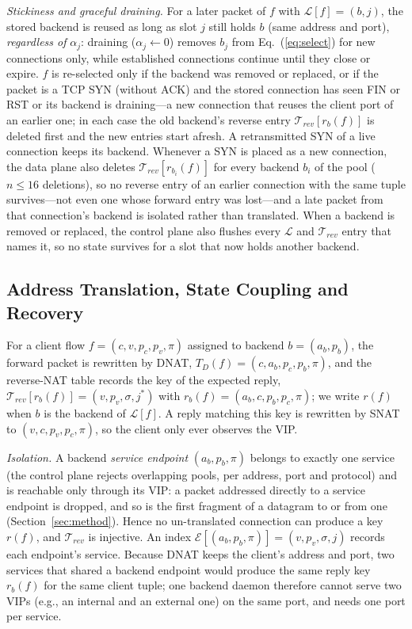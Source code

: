 \documentclass[conference]{IEEEtran}
\begin{document}
\textit{Stickiness and graceful draining.} For a later packet of $f$ with
$\mathcal{L}[f]=(b,j)$, the stored backend is reused as long as slot $j$ still
holds $b$ (same address and port), \emph{regardless of} $\alpha_j$: draining
($\alpha_j \gets 0$) removes $b_j$ from Eq.~(\ref{eq:select}) for new
connections only, while established connections continue until they close or
expire. $f$ is re-selected only if the backend was removed or replaced, or if
the packet is a TCP SYN (without ACK) and the stored connection has seen FIN or
RST or its backend is draining---a new connection that reuses the client port
of an earlier one; in each case the old backend's reverse entry
$\mathcal{T}_{rev}[r_{b}(f)]$ is deleted first and the new entries start
afresh. A retransmitted SYN of a live connection keeps its backend. Whenever a
SYN is placed as a new connection, the data plane also deletes
$\mathcal{T}_{rev}[r_{b_i}(f)]$ for every backend $b_i$ of the pool ($n \le 16$
deletions), so no reverse entry of an earlier connection with the same tuple
survives---not even one whose forward entry was lost---and a late packet from
that connection's backend is isolated rather than translated.
When a backend is removed or replaced, the control plane also flushes every
$\mathcal{L}$ and $\mathcal{T}_{rev}$ entry that names it, so no state
survives for a slot that now holds another backend.

\subsection{Address Translation, State Coupling and Recovery}
\label{sec:coupling}
For a client flow $f=(c,v,p_c,p_v,\pi)$ assigned to backend $b=(a_b,p_b)$, the
forward packet is rewritten by DNAT, $T_D(f)=(c,a_b,p_c,p_b,\pi)$, and the
reverse-NAT table records the key of the expected reply,
$\mathcal{T}_{rev}[r_b(f)] = (v,p_v,\sigma,j^*)$ with
$r_b(f)=(a_b,c,p_b,p_c,\pi)$; we write $r(f)$ when $b$ is the backend of
$\mathcal{L}[f]$. A reply matching this key is rewritten by SNAT to
$(v,c,p_v,p_c,\pi)$, so the client only ever observes the VIP.

\textit{Isolation.} A backend \emph{service endpoint} $(a_b,p_b,\pi)$ belongs
to exactly one service (the control plane rejects overlapping pools, per
address, port and protocol) and is reachable only through its VIP: a packet
addressed directly to a service endpoint is dropped, and so is the first
fragment of a datagram to or from one (Section~\ref{sec:method}). Hence no un-translated
connection can produce a key $r(f)$, and $\mathcal{T}_{rev}$ is injective. An
index $\mathcal{E}[(a_b,p_b,\pi)] = (v,p_v,\sigma,j)$ records each endpoint's
service. Because DNAT keeps the client's address and port, two services that
shared a backend endpoint would produce the same reply key $r_b(f)$ for the
same client tuple; one backend daemon therefore cannot serve two VIPs (e.g.,
an internal and an external one) on the same port, and needs one port per
service.
\end{document}
